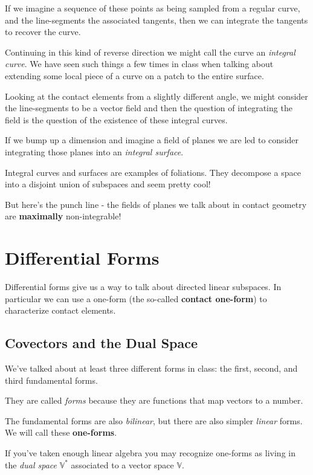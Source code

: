 \documentclass{article}
\begin{document}
If we imagine a sequence of these points as being sampled from a regular curve, and the line-segments
the associated tangents, then we can integrate the tangents to recover the curve.

Continuing in this kind of reverse direction we might call the curve an
\textit{integral curve}. We have seen such things a few times in class when
talking about extending some local piece of a curve on a patch to the entire surface.

Looking at the contact elements from a slightly different angle, we might
consider the line-segments to be a vector field and then the question of
integrating the field is the question of the existence of these integral curves.

If we bump up a dimension and imagine a field of planes we are led to consider
integrating those planes into an \textit{integral surface}.

Integral curves and surfaces are examples of foliations. They decompose a space
into a disjoint union of subspaces and seem pretty cool!

But here's the punch line - the fields of planes we talk about in contact
geometry are \textbf{maximally} non-integrable!

\section {Differential Forms}

Differential forms give us a way to talk about directed linear subspaces. In
particular we can use a one-form (the so-called \textbf{contact one-form}) to
characterize contact elements.

\subsection{Covectors and the Dual Space}
We've talked about at least three different forms in class: the first, second,
and third fundamental forms.

They are called \textit{forms} because they are functions that map vectors to a
number.

The fundamental forms are also \textit{bilinear}, but there are also simpler
\textit{linear} forms. We will call these \textbf{one-forms}.

If you've taken enough linear algebra you may recognize one-forms as living in
the \textit{dual space} $\mathbb{V}^{*}$ associated to a vector space $\mathbb{V}$.
\end{document}
